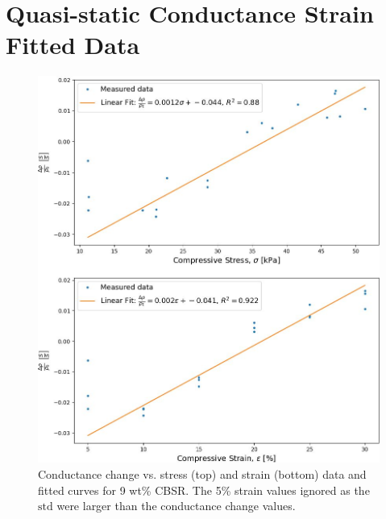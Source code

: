 \section{Quasi-static Conductance Strain Fitted  Data}
\begin{figure}[H]
	\centering
	\includegraphics[width=0.7\linewidth]{Figures/CBSR_9p_cond_stress_strain_sin_titulo.jpg}
	\caption{Conductance change vs. stress (top) and strain (bottom) data and fitted curves for 9 wt\% CBSR. The 5\% strain values ignored as the $\mathrm{std}$ were larger than the conductance change values.}
	\label{fig:quasi_r_9p}
\end{figure}

